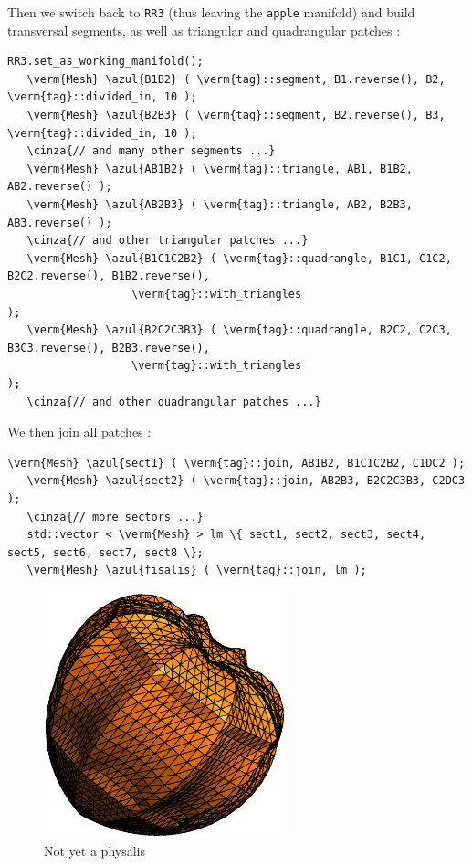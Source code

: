 Then we switch back to {\small\tt RR3} (thus leaving the {\small\tt apple} manifold) and build
transversal segments, as well as triangular and quadrangular patches :

\begin{Verbatim}[commandchars=\\\{\},formatcom=\small\tt,frame=single,
   label=parag-\ref{\numb section 2.\numb parag 11}.cpp,rulecolor=\color{coment},
   baselinestretch=0.94,framesep=2mm]
   RR3.set_as_working_manifold();
   \verm{Mesh} \azul{B1B2} ( \verm{tag}::segment, B1.reverse(), B2, \verm{tag}::divided_in, 10 );
   \verm{Mesh} \azul{B2B3} ( \verm{tag}::segment, B2.reverse(), B3, \verm{tag}::divided_in, 10 );
   \cinza{// and many other segments ...}
   \verm{Mesh} \azul{AB1B2} ( \verm{tag}::triangle, AB1, B1B2, AB2.reverse() );
   \verm{Mesh} \azul{AB2B3} ( \verm{tag}::triangle, AB2, B2B3, AB3.reverse() );
   \cinza{// and other triangular patches ...}
   \verm{Mesh} \azul{B1C1C2B2} ( \verm{tag}::quadrangle, B1C1, C1C2, B2C2.reverse(), B1B2.reverse(),
                   \verm{tag}::with_triangles                                           );
   \verm{Mesh} \azul{B2C2C3B3} ( \verm{tag}::quadrangle, B2C2, C2C3, B3C3.reverse(), B2B3.reverse(),
                   \verm{tag}::with_triangles                                           );
   \cinza{// and other quadrangular patches ...}   
\end{Verbatim}

We then join all patches :
\begin{Verbatim}[commandchars=\\\{\},formatcom=\small\tt,frame=single,
   label=parag-\ref{\numb section 2.\numb parag 11}.cpp,rulecolor=\color{coment},
   baselinestretch=0.94,framesep=2mm]
   \verm{Mesh} \azul{sect1} ( \verm{tag}::join, AB1B2, B1C1C2B2, C1DC2 );
   \verm{Mesh} \azul{sect2} ( \verm{tag}::join, AB2B3, B2C2C3B3, C2DC3 );
   \cinza{// more sectors ...}
   std::vector < \verm{Mesh} > lm \{ sect1, sect2, sect3, sect4, sect5, sect6, sect7, sect8 \};
   \verm{Mesh} \azul{fisalis} ( \verm{tag}::join, lm ); 
\end{Verbatim}

\begin{figure}[ht] \centering
  \includegraphics[width=70mm]{fisalis-round}
  \caption{Not yet a physalis}
  \label{\numb section 2.\numb fig 13}
\end{figure}

